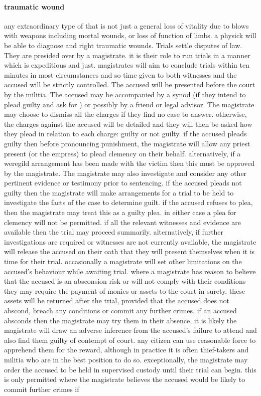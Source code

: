 \paragraph{traumatic wound} any extraordinary type of  that is not just a general loss of vitality due to blows with weapons including mortal wounds, or loss of function of limbs. a physick will be able to diagnose and right traumatic wounds.
 Trials settle disputes of law. They are presided over by a magistrate. it is their role to run trials in a manner which is expeditious and just. magistrates will aim to conclude trials within ten minutes in most circumstances and so time given to both witnesses and the accused will be strictly controlled. \localpar {} The accused will be presented before the court by the militia. The accused may be accompanied by a synod  (if they intend to plead guilty and ask for ) or possibly by a friend or legal advisor. The magistrate may choose to dismiss all the charges if they find no case to answer. otherwise, the charges against the accused will be detailed and they will then be asked how they plead in relation to each charge: guilty or not guilty. if the accused pleads guilty then before pronouncing punishment, the magistrate will allow any priest present (or the empress) to plead clemency on their behalf. alternatively, if a weregild arrangement has been made with the victim then this must be approved by the magistrate. \localpar The magistrate may also investigate and consider any other pertinent evidence or testimony prior to sentencing. if the accused pleads not guilty then the magistrate will make arrangements for a trial to be held to investigate the facts of the case to determine guilt. if the accused refuses to plea, then the magistrate may treat this as a guilty plea. in either case a plea for clemency will not be permitted. if all the relevant witnesses and evidence are available then the trial may proceed summarily. alternatively, if further investigations are required or witnesses are not currently available, the magistrate will release the accused on their oath that they will present themselves when it is time for their trial. occasionally a magistrate will set other limitations on the accused’s behaviour while awaiting trial. where a magistrate has reason to believe that the accused is an absconsion risk or will not comply with their conditions they may require the payment of monies or assets to the court in surety. these assets will be returned after the trial, provided that the accused does not abscond, breach any conditions or commit any further crimes. if an accused absconds then the magistrate may try them in their absence. it is likely the magistrate will draw an adverse inference from the accused's failure to attend and also find them guilty of contempt of court. any citizen can use reasonable force to apprehend them for the reward, although in practice it is often thief-takers and militia who are in the best position to do so. exceptionally, the magistrate may order the accused to be held in supervised custody until their trial can begin. this is only permitted where the magistrate believes the accused would be likely to commit further crimes if 